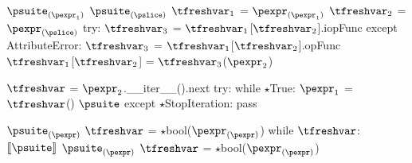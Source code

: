 \documentclass{article}
\begin{document}
\newsavebox{\augmentedSliceAssignmentBox}
\begin{lrbox}{\augmentedSliceAssignmentBox}
\begin{python}
$\psuite_{(\pexpr_1)}$
$\psuite_{(\pslice)}$
$\tfreshvar_1$ = $\pexpr_{(\pexpr_1)}$
$\tfreshvar_2$ = $\pexpr_{(\pslice)}$
try:
  $\tfreshvar_3$ = $\tfreshvar_1$[$\tfreshvar_2$].iopFunc
except AttributeError:
  $\tfreshvar_3$ = $\tfreshvar_1$[$\tfreshvar_2$].opFunc
$\tfreshvar_1$[$\tfreshvar_2$] = $\tfreshvar_3$($\pexpr_2$)
\end{python}
\end{lrbox}

\begin{mathpar}
\end{mathpar}

\newsavebox{\forBox}
\begin{lrbox}{\forBox}
\begin{python}
$\tfreshvar$ = $\pexpr_2$.__iter__().next
try:
  while $\star$True:
    $\pexpr_1$ = $\tfreshvar$()
    $\psuite$
except $\star$StopIteration:
  pass
\end{python}
\end{lrbox}

\begin{mathpar}
\end{mathpar}

\newsavebox{\whileBox}
\begin{lrbox}{\whileBox}
\begin{python}
$\psuite_{(\pexpr)}$
$\tfreshvar$ = $\star$bool($\pexpr_{(\pexpr)}$)
while $\tfreshvar$:
  $\meaningof{\psuite}$
  $\psuite_{(\pexpr)}$
  $\tfreshvar$ = $\star$bool($\pexpr_{(\pexpr)}$)
\end{python}
\end{lrbox}

\begin{mathpar}
\end{mathpar}
\end{document}
